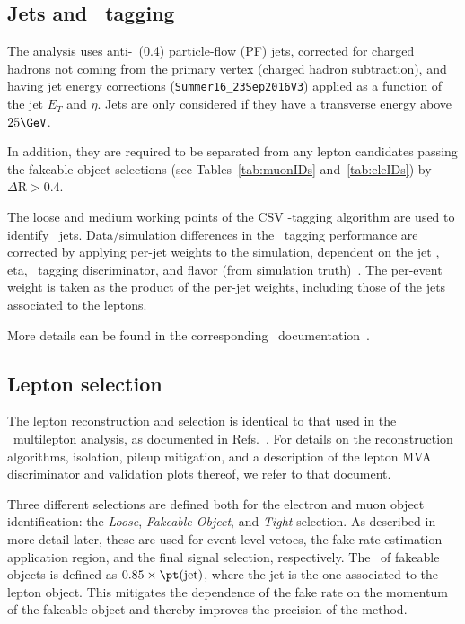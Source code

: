 \subsection{Jets and \cPqb\ tagging}
The analysis uses anti-\kt\ (0.4) particle-flow (PF) jets, corrected for charged hadrons not coming from the primary vertex (charged hadron subtraction), and having jet energy corrections (\verb|Summer16_23Sep2016V3|) applied as a function of the jet $E_T$ and $\eta$.
Jets are only considered if they have a transverse energy above $25\GeV$.

In addition, they are required to be separated from any lepton candidates passing the fakeable object selections (see Tables~\ref{tab:muonIDs} and~\ref{tab:eleIDs}) by $\Delta\mathrm{R}>0.4$.

The loose and medium working points of the CSV \cPqb-tagging algorithm are used to identify \cPqb\ jets.
Data/simulation differences in the \cPqb\ tagging performance are corrected by applying per-jet weights to the simulation, dependent on the jet \pt, eta, \cPqb\ tagging discriminator, and flavor (from simulation truth)~\cite{btagRecommTWiki}.
The per-event weight is taken as the product of the per-jet weights, including those of the jets associated to the leptons.

More details can be found in the corresponding \ttH\ documentation~\cite{CMS_AN_2016-211,CMS_AN_2017-029}.

\subsection{Lepton selection}
The lepton reconstruction and selection is identical to that used in the \ttH\ multilepton analysis, as documented in Refs.~\cite{CMS_AN_2016-211,CMS_AN_2017-029}.
For details on the reconstruction algorithms, isolation, pileup mitigation, and a description of the lepton MVA discriminator and validation plots thereof, we refer to that document.

Three different selections are defined both for the electron and muon
object identification: the \emph{Loose}, \emph{Fakeable Object},
and \emph{Tight} selection.
As described in more detail later, these are used for event level vetoes, the fake rate estimation application region, and the final signal selection, respectively.
The \pt\ of fakeable objects is defined as $0.85\times\pt(\mathrm{jet})$, where the jet is the one associated to the lepton object.
This mitigates the dependence of the fake rate on the momentum of the fakeable object and thereby improves the precision of the method.

